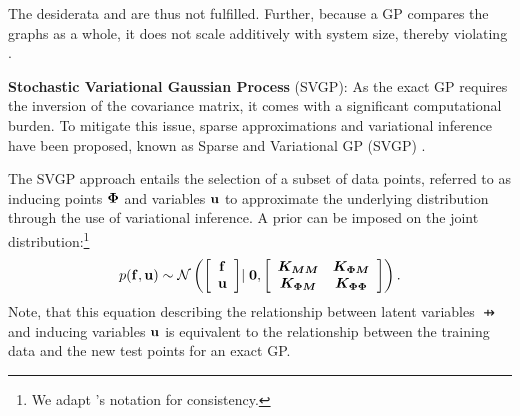 The desiderata \desfive{} and \desseven{} are thus not fulfilled. 
Further, because a GP compares the graphs as a whole, it does not scale additively with system size, thereby violating \desfour{}.

\textbf{Stochastic Variational Gaussian Process} (SVGP): As the exact GP requires the inversion of the covariance matrix, it comes with a significant computational burden. To mitigate this issue, sparse approximations and variational inference have been proposed, known as Sparse and Variational GP (SVGP) \citep{titsias2009Variational, hensman2013Gaussian, hensman2014Scalable}. 

The SVGP approach entails the selection of a subset of data points, referred to as inducing points $\bm{\Phi}$ and variables $\mathbf{u}$ to approximate the underlying distribution through the use of variational inference. A prior can be imposed on the joint distribution:\footnote{We adapt \citet{hensman2014Scalable}'s notation for consistency.}
\begin{equation}
	p(\mathbf{f}, \mathbf{u}) \sim \mathcal{N} \left(
	\begin{aligned}
		\left[
			{\begin{array}{c}
				\mathbf{f}\\
				\mathbf{u}\\
			 \end{array}}
		\right] 
	\end{aligned}\vert\; \mathbf{0}, 
	\begin{aligned}
		\left[
			{\begin{array}{cc}
				\bm{K}_{\bm{M} \bm{M}} & \bm{K}_{\bm{\Phi}\bm{M}}\\
				\bm{K}_{\bm{\Phi} \bm{M}} & \bm{K}_{\bm{\Phi} \bm{\Phi}}\\
			\end{array}}
		\right]	
	\end{aligned}
	\right).
\end{equation} 
Note, that this equation describing the relationship between latent variables $\pfun$ and inducing variables $\mathbf{u}$ is equivalent to the relationship between the training data and the new test points for an exact GP. 

